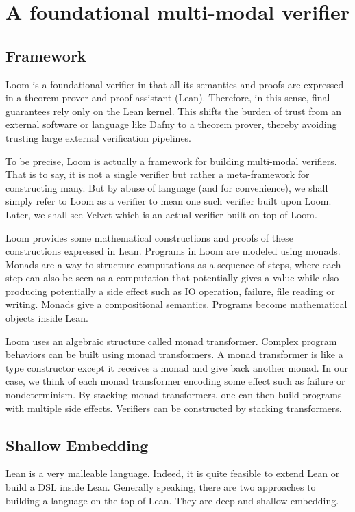 \chapter{A foundational multi-modal verifier}

\section{Framework}

Loom is a foundational verifier in that all its semantics and proofs are
expressed in a theorem prover and proof assistant (Lean). Therefore, in this
sense, final guarantees rely only on the Lean kernel. This shifts the burden of
trust from an external software or language like Dafny to a theorem prover,
thereby avoiding trusting large external verification pipelines.

To be precise, Loom is actually a framework for building multi-modal verifiers.
That is to say, it is not a single verifier but rather a meta-framework for
constructing many. But by abuse of language (and for convenience), we shall
simply refer to Loom as a verifier to mean one such verifier built upon Loom.
Later, we shall see Velvet which is an actual verifier built on top of Loom.

Loom provides some mathematical constructions and proofs of these constructions
expressed in Lean. Programs in Loom are modeled using monads. Monads are a way
to structure computations as a sequence of steps, where each step can also be
seen as a computation that potentially gives a value while also producing
potentially a side effect such as IO operation, failure, file reading or
writing. Monads give a compositional semantics. Programs become mathematical
objects inside Lean.

Loom uses an algebraic structure called monad transformer. Complex program
behaviors can be built using monad transformers. A monad transformer is like a
type constructor except it receives a monad and give back another monad. In our
case, we think of each monad transformer encoding some effect such as failure or
nondeterminism. By stacking monad transformers, one can then build programs with
multiple side effects. Verifiers can be constructed by stacking transformers.

\section{Shallow Embedding}

Lean is a very malleable language. Indeed, it is quite feasible to extend Lean
or build a DSL inside Lean. Generally speaking, there are two approaches to
building a language on the top of Lean. They are deep and shallow embedding.

